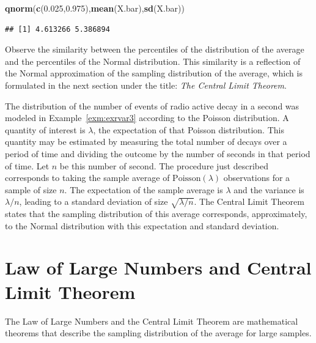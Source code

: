 \documentclass[
]{krantz}
\makeatletter
\newenvironment{Shaded}{\begin{snugshade}}{\end{snugshade}}
\newcommand{\FloatTok}[1]{\textcolor[rgb]{0.00,0.00,0.81}{#1}}
\newcommand{\KeywordTok}[1]{\textcolor[rgb]{0.13,0.29,0.53}{\textbf{#1}}}
\newcommand{\NormalTok}[1]{#1}
\newenvironment{kframe}{%
\medskip{}
\setlength{\fboxsep}{.8em}
 \def\at@end@of@kframe{}%
 \ifinner\ifhmode%
  \def\at@end@of@kframe{\end{minipage}}%
  \begin{minipage}{\columnwidth}%
 \fi\fi%
 \def\FrameCommand##1{\hskip\@totalleftmargin \hskip-\fboxsep
 \colorbox{shadecolor}{##1}\hskip-\fboxsep
     \hskip-\linewidth \hskip-\@totalleftmargin \hskip\columnwidth}%
 \MakeFramed {\advance\hsize-\width
   \@totalleftmargin\z@ \linewidth\hsize
   \@setminipage}}%
 {\par\unskip\endMakeFramed%
 \at@end@of@kframe}
\renewenvironment{Shaded}{\begin{kframe}}{\end{kframe}}
\theoremstyle{definition}
\theoremstyle{definition}
\theoremstyle{definition}
\theoremstyle{remark}
\let\BeginKnitrBlock\begin \let\EndKnitrBlock\end
\makeatother
\begin{document}
\begin{Shaded}
\begin{Highlighting}[]
\KeywordTok{qnorm}\NormalTok{(}\KeywordTok{c}\NormalTok{(}\FloatTok{0.025}\NormalTok{,}\FloatTok{0.975}\NormalTok{),}\KeywordTok{mean}\NormalTok{(X.bar),}\KeywordTok{sd}\NormalTok{(X.bar))}
\end{Highlighting}
\end{Shaded}

\begin{verbatim}
## [1] 4.613266 5.386894
\end{verbatim}

Observe the similarity between the percentiles of the distribution of
the average and the percentiles of the Normal distribution. This
similarity is a reflection of the Normal approximation of the sampling
distribution of the average, which is formulated in the next section
under the title: \emph{The Central Limit Theorem}.

\BeginKnitrBlock{example}
\protect\hypertarget{exm:exsampdist3}{}{\label{exm:exsampdist3} }The distribution of the number of events of radio
active decay in a second was modeled in Example~\ref{exm:exrvar3}
according to the Poisson distribution. A quantity of interest is
\(\lambda\), the expectation of that Poisson distribution. This quantity
may be estimated by measuring the total number of decays over a period
of time and dividing the outcome by the number of seconds in that period
of time. Let \(n\) be this number of second. The procedure just described
corresponds to taking the sample average of \(\mathrm{Poisson}(\lambda)\)
observations for a sample of size \(n\). The expectation of the sample
average is \(\lambda\) and the variance is \(\lambda/n\), leading to a
standard deviation of size \(\sqrt{\lambda/n}\). The Central Limit Theorem
states that the sampling distribution of this average corresponds,
approximately, to the Normal distribution with this expectation and
standard deviation.
\EndKnitrBlock{example}

\hypertarget{law-of-large-numbers-and-central-limit-theorem}{%
\section{Law of Large Numbers and Central Limit Theorem}\label{law-of-large-numbers-and-central-limit-theorem}}

The Law of Large Numbers and the Central Limit Theorem are mathematical
theorems that describe the sampling distribution of the average for
large samples.
\end{document}
